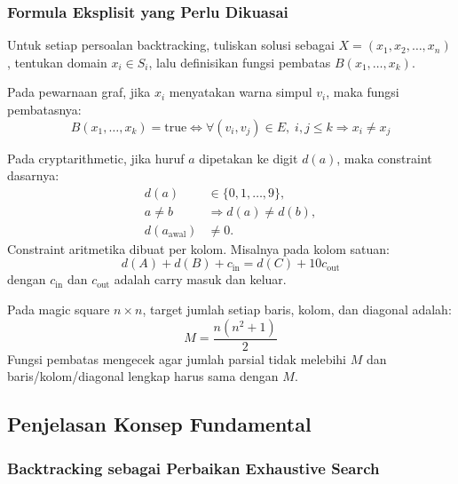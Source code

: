 \subsubsection{Formula Eksplisit yang Perlu Dikuasai}

\begin{jawab}
Untuk setiap persoalan backtracking, tuliskan solusi sebagai $X=(x_1,x_2,\ldots,x_n)$, tentukan domain $x_i \in S_i$, lalu definisikan fungsi pembatas $B(x_1,\ldots,x_k)$.
\end{jawab}

Pada pewarnaan graf, jika $x_i$ menyatakan warna simpul $v_i$, maka fungsi pembatasnya:
\begin{equation}
    B(x_1,\ldots,x_k)=\text{true}
    \iff
    \forall (v_i,v_j)\in E,\; i,j\le k \Rightarrow x_i \ne x_j
    \label{eq:bt-graph-coloring-bound}
\end{equation}

Pada cryptarithmetic, jika huruf $a$ dipetakan ke digit $d(a)$, maka constraint dasarnya:
\begin{align}
    d(a) &\in \{0,1,\ldots,9\}, \label{eq:crypto-domain}\\
    a \ne b &\Rightarrow d(a)\ne d(b), \label{eq:crypto-unique}\\
    d(a_{\text{awal}}) &\ne 0. \label{eq:crypto-leading-zero}
\end{align}
Constraint aritmetika dibuat per kolom. Misalnya pada kolom satuan:
\begin{equation}
    d(A)+d(B)+c_{\text{in}} = d(C)+10c_{\text{out}}
    \label{eq:crypto-column}
\end{equation}
dengan $c_{\text{in}}$ dan $c_{\text{out}}$ adalah carry masuk dan keluar.

Pada magic square $n\times n$, target jumlah setiap baris, kolom, dan diagonal adalah:
\begin{equation}
    M = \frac{n(n^2+1)}{2}
    \label{eq:magic-square-sum}
\end{equation}
Fungsi pembatas mengecek agar jumlah parsial tidak melebihi $M$ dan baris/kolom/diagonal lengkap harus sama dengan $M$.

\subsection{Penjelasan Konsep Fundamental}

\subsubsection{Backtracking sebagai Perbaikan Exhaustive Search}

